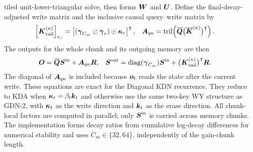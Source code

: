 \documentclass{article} %
\begin{document}
tiled unit-lower-triangular solve, then forms $\boldsymbol{W}$ and $\boldsymbol{U}$. Define the
final-decay-adjusted write matrix and the inclusive causal query--write matrix by
\begin{equation}
\begin{aligned}
  \left[\boldsymbol{K}_{\mathrm{tail}}^{(\kappa)}\right]_{r,:}
  &=\left[
      (\boldsymbol{\gamma}_{C_m}\oslash\boldsymbol{\gamma}_r)\odot\boldsymbol{\kappa}_r
    \right]^{\intercal},
  &
  \boldsymbol{A}_{q\kappa}
  &=\operatorname{tril}\!\left(
      \overline{\boldsymbol{Q}}\bigl(\overline{\boldsymbol{K}}^{(\kappa)}\bigr)^{\intercal}
    \right).
\end{aligned}
  \label{eq:chunk-memory-tail-output}
\end{equation}
The outputs for the whole chunk and its outgoing memory are then
\begin{equation}
\begin{aligned}
  \boldsymbol{O}
  &=\overline{\boldsymbol{Q}}\boldsymbol{S}^{\mathrm{in}}+\boldsymbol{A}_{q\kappa}\boldsymbol{R},
  &
  \boldsymbol{S}^{\mathrm{out}}
  &=\operatorname{diag}(\boldsymbol{\gamma}_{C_m})\boldsymbol{S}^{\mathrm{in}}
    +\bigl(\boldsymbol{K}_{\mathrm{tail}}^{(\kappa)}\bigr)^{\intercal}\boldsymbol{R}.
\end{aligned}
  \label{eq:chunk-memory-output-state}
\end{equation}
The diagonal of $\boldsymbol{A}_{q\kappa}$ is included because $\boldsymbol{o}_t$ reads the state after the
current write. These equations are exact for the Diagonal KDN recurrence. They reduce to KDA when
$\boldsymbol{\kappa}_t=\beta_t\boldsymbol{k}_t$ and otherwise use the same two-key WY structure as GDN-2, with
$\boldsymbol{\kappa}_t$ as the write direction and $\boldsymbol{k}_t$ as the erase direction. All chunk-local
factors are computed in parallel; only $\boldsymbol{S}^{\mathrm{in}}$ is carried across memory chunks.
The implementation forms decay ratios from cumulative log-decay differences for numerical
stability and uses $C_m\in\{32,64\}$, independently of the gain-chunk length.
\end{document}
